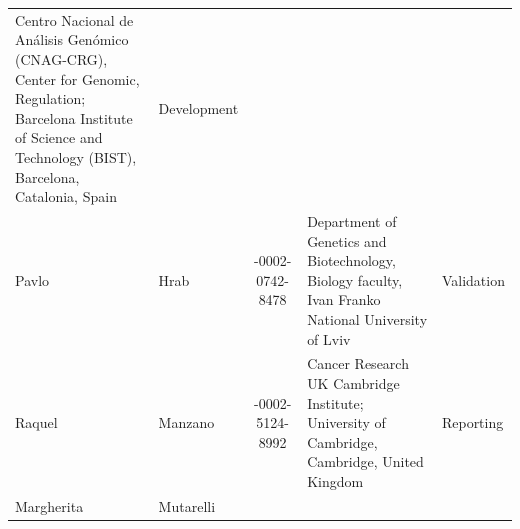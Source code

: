 \documentclass[
]{article}
\begin{document}
\begin{longtable}[]{@{}llcll@{}}
\begin{minipage}[t]{0.27\columnwidth}
Centro Nacional de Análisis Genómico (CNAG-CRG), Center for Genomic,
Regulation; Barcelona Institute of Science and Technology (BIST),
Barcelona, Catalonia, Spain\strut
\end{minipage} & \begin{minipage}[t]{0.13\columnwidth}\raggedright
Development\strut
\end{minipage}\tabularnewline
\begin{minipage}[t]{0.13\columnwidth}\raggedright
Pavlo\strut
\end{minipage} & \begin{minipage}[t]{0.19\columnwidth}\raggedright
Hrab\strut
\end{minipage} & \begin{minipage}[t]{0.15\columnwidth}\centering
0000-0002-0742-8478\strut
\end{minipage} & \begin{minipage}[t]{0.27\columnwidth}\raggedright
Department of Genetics and Biotechnology, Biology faculty, Ivan Franko
National University of Lviv\strut
\end{minipage} & \begin{minipage}[t]{0.13\columnwidth}\raggedright
Validation\strut
\end{minipage}\tabularnewline
\begin{minipage}[t]{0.13\columnwidth}\raggedright
Raquel\strut
\end{minipage} & \begin{minipage}[t]{0.19\columnwidth}\raggedright
Manzano\strut
\end{minipage} & \begin{minipage}[t]{0.15\columnwidth}\centering
0000-0002-5124-8992\strut
\end{minipage} & \begin{minipage}[t]{0.27\columnwidth}\raggedright
Cancer Research UK Cambridge Institute; University of Cambridge,
Cambridge, United Kingdom\strut
\end{minipage} & \begin{minipage}[t]{0.13\columnwidth}\raggedright
Reporting\strut
\end{minipage}\tabularnewline
\begin{minipage}[t]{0.13\columnwidth}\raggedright
Margherita\strut
\end{minipage} & \begin{minipage}[t]{0.19\columnwidth}\raggedright
Mutarelli\strut
\end{minipage} & \begin{minipage}[t]{0.15\columnwidth}\centering

\end{minipage}
\end{longtable}
\end{document}

